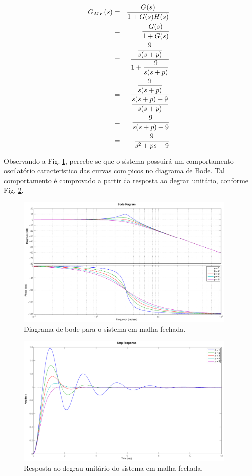 \begin{eqnarray}
G_{MF}(s) & = & \frac{G(s)}{1+G(s)H(s)}\nonumber\\
          & = & \frac{G(s)}{1+G(s)}\nonumber\\
          & = & \frac{\displaystyle\frac{9}{s(s+p)}}{1+\displaystyle\frac{9}{s(s+p)}}\nonumber\\
          & = & \frac{\displaystyle\frac{9}{s(s+p)}}{\displaystyle\frac{s(s+p)+9}{s(s+p)}}\nonumber\\
          & = & \frac{9}{s(s+p)+9}\nonumber\\
          & = & \frac{9}{s^2 + ps + 9}\label{eq:G_MF_q1}
\end{eqnarray}

Observando a Fig. \ref{fig:bode_mf}, percebe-se que o sistema possuirá um
comportamento oscilatório característico das curvas com picos no diagrama de
Bode. Tal comportamento é comprovado a partir da resposta ao degrau unitário,
conforme Fig. \ref{fig:resp_deg_mf}.

\begin{figure}[htb]
\centering
    \includegraphics[width=0.95\textwidth]{imgs/questao1/bode_mf}
    \caption{Diagrama de bode para o sistema em malha fechada.}
    \label{fig:bode_mf}
\end{figure}

\begin{figure}[htb]
\centering
    \includegraphics[width=0.95\textwidth]{imgs/questao1/resp_deg_mf}
    \caption{Resposta ao degrau unitário do sistema em malha fechada.}
    \label{fig:resp_deg_mf}
\end{figure}

